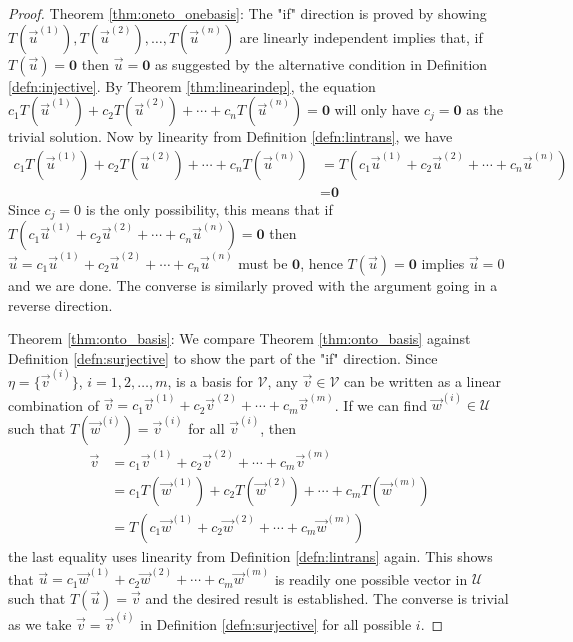 \begin{proof}
Theorem \ref{thm:oneto_onebasis}: The "if" direction is proved by showing $T(\vec{u}^{(1)}), T(\vec{u}^{(2)}),\allowbreak \ldots, T(\vec{u}^{(n)})$ are linearly independent implies that, if $T(\vec{u}) = \textbf{0}$ then $\vec{u} = \textbf{0}$ as suggested by the alternative condition in Definition \ref{defn:injective}. By Theorem \ref{thm:linearindep}, the equation $c_1T(\vec{u}^{(1)}) + c_2T(\vec{u}^{(2)}) + \cdots + c_nT(\vec{u}^{(n)}) = \textbf{0}$ will only have $c_j = \textbf{0}$ as the trivial solution. Now by linearity from Definition \ref{defn:lintrans}, we have
\begin{align*}
c_1T(\vec{u}^{(1)}) + c_2T(\vec{u}^{(2)}) + \cdots + c_nT(\vec{u}^{(n)}) &= T(c_1\vec{u}^{(1)} + c_2\vec{u}^{(2)} + \cdots + c_n\vec{u}^{(n)}) \\
&= \textbf{0}    
\end{align*}
Since $c_j = 0$ is the only possibility, this means that if $T(c_1\vec{u}^{(1)} + c_2\vec{u}^{(2)} + \cdots + c_n\vec{u}^{(n)}) = \textbf{0}$ then $\vec{u} = c_1\vec{u}^{(1)} + c_2\vec{u}^{(2)} + \cdots + c_n\vec{u}^{(n)}$ must be $\textbf{0}$, hence $T(\vec{u}) = \textbf{0}$ implies $\vec{u} = 0$ and we are done. The converse is similarly proved with the argument going in a reverse direction. \par
Theorem \ref{thm:onto_basis}: We compare Theorem \ref{thm:onto_basis} against Definition \ref{defn:surjective} to show the part of the "if" direction. Since $\eta = \{\vec{v}^{(i)}\}$, $i = 1,2,\ldots,m$, is a basis for $\mathcal{V}$, any $\vec{v} \in \mathcal{V}$ can be written as a linear combination of $\vec{v} = c_1\vec{v}^{(1)} + c_2\vec{v}^{(2)} + \cdots + c_m\vec{v}^{(m)}$. If we can find $\vec{w}^{(i)} \in \mathcal{U}$ such that $T(\vec{w}^{(i)}) = \vec{v}^{(i)}$ for all $\vec{v}^{(i)}$, then
\begin{align*}
\vec{v} &= c_1\vec{v}^{(1)} + c_2\vec{v}^{(2)} + \cdots + c_m\vec{v}^{(m)}\\
&= c_1T(\vec{w}^{(1)}) + c_2T(\vec{w}^{(2)}) + \cdots + c_mT(\vec{w}^{(m)}) \\
&= T(c_1\vec{w}^{(1)} + c_2\vec{w}^{(2)} + \cdots + c_m\vec{w}^{(m)})
\end{align*}
the last equality uses linearity from Definition \ref{defn:lintrans} again. This shows that $\vec{u} = c_1\vec{w}^{(1)} + c_2\vec{w}^{(2)} + \cdots + c_m\vec{w}^{(m)}$ is readily one possible vector in $\mathcal{U}$ such that $T(\vec{u}) = \vec{v}$ and the desired result is established. The converse is trivial as we take $\vec{v} = \vec{v}^{(i)}$ in Definition \ref{defn:surjective} for all possible $i$.
\end{proof}

